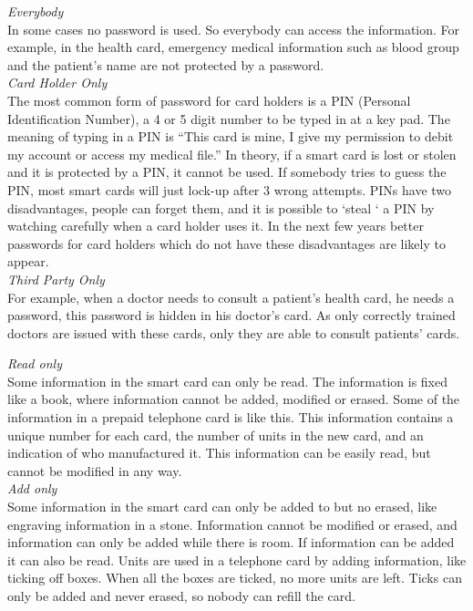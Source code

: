 \begin{htmllist}
    {\it Everybody}\\
    In some cases no password is used. So everybody can access the
    information. For example, in the health card, emergency medical
    information such as blood group and the patient's name are not
    protected by a password.\\
    
    {\it Card Holder Only}\\
    The most common form of password for card holders is a PIN (Personal
    Identification Number), a 4 or 5 digit number to be typed in at a key
    pad. The meaning of typing in a PIN is ``This card is mine, I give my
    permission to debit my account or access my medical file.'' In theory,
    if a smart card is lost or stolen and it is protected by a PIN, it
    cannot be used. If somebody tries to guess the PIN, most smart cards
    will just lock-up after 3 wrong attempts. PINs have two disadvantages,
    people can forget them, and it is possible to `steal ` a PIN by
    watching carefully when a card holder uses it. In the next few years
    better passwords for card holders which do not have these disadvantages
    are likely to appear.\\
    
    {\it Third Party Only}\\
    For example, when a doctor needs to consult a patient's health card, he
    needs a password, this password is hidden in his doctor's card. As only
    correctly trained doctors are issued with these cards, only they are
    able to consult patients' cards.\\

    
    {\it Read only}\\
    Some information in the smart card can only be read. The information is
    fixed like a book, where information cannot be added, modified or
    erased. Some of the information in a prepaid telephone card is like
    this. This information contains a unique number for each card, the
    number of units in the new card, and an indication of who manufactured
    it. This information can be easily read, but cannot be modified in any
    way.\\
    
    {\it Add only}\\
    Some information in the smart card can only be added to but no erased,
    like engraving information in a stone. Information cannot be modified
    or erased, and information can only be added while there is room. If
    information can be added it can also be read. Units are used in a
    telephone card by adding information, like ticking off boxes. When all
    the boxes are ticked, no more units are left. Ticks can only be added
    and never erased, so nobody can refill the card.\\
    

\end{htmllist}
